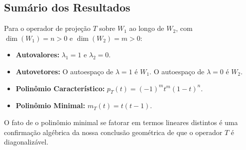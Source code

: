 \subsection*{Sumário dos Resultados}

Para o operador de projeção $T$ sobre $W_1$ ao longo de $W_2$, com $\dim(W_1)=n>0$ e
$\dim(W_2)=m>0$:

\begin{itemize}
\item \textbf{Autovalores:} $\lambda_1=1$ e $\lambda_2=0$.
\item \textbf{Autovetores:} O autoespaço de $\lambda=1$ é $W_1$. O autoespaço de $\lambda=0$ é $W_2$.
\item \textbf{Polinômio Característico:} $p_T(t)=(-1)^m t^m (1-t)^n$.
\item \textbf{Polinômio Minimal:} $m_T(t)=t(t-1)$.
\end{itemize}

O fato de o polinômio minimal se fatorar em termos lineares distintos é uma confirmação algébrica
da nossa conclusão geométrica de que o operador $T$ é diagonalizável.